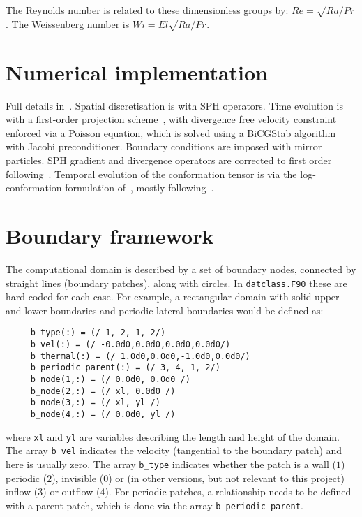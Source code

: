 \documentclass[notitlepage]{revtex4-2}
\begin{document}
The Reynolds number is related to these dimensionless groups by: $Re=\sqrt{Ra/Pr}$. The Weissenberg number is $Wi=El\sqrt{Ra/Pr}$.


\section{Numerical implementation}

Full details in~\cite{king_2021}. Spatial discretisation is with SPH operators. Time evolution is with a first-order projection scheme~\cite{chorin_1968}, with divergence free velocity constraint enforced via a Poisson equation, which is solved using a BiCGStab algorithm with Jacobi preconditioner. Boundary conditions are imposed with mirror particles. SPH gradient and divergence operators are corrected to first order following~\cite{bonet_lok}. Temporal evolution of the conformation tensor is via the log-conformation formulation of~\cite{fattal_2004,fattal_2005}, mostly following~\cite{lopez_2019}.

\section{Boundary framework}

The computational domain is described by a set of boundary nodes, connected by straight lines (boundary patches), along with circles. In \texttt{datclass.F90} these are hard-coded for each case. For example, a rectangular domain with solid upper and lower boundaries and periodic lateral boundaries would be defined as:
\begin{verbatim}
     b_type(:) = (/ 1, 2, 1, 2/)
     b_vel(:) = (/ -0.0d0,0.0d0,0.0d0,0.0d0/)    
     b_thermal(:) = (/ 1.0d0,0.0d0,-1.0d0,0.0d0/)
     b_periodic_parent(:) = (/ 3, 4, 1, 2/)
     b_node(1,:) = (/ 0.0d0, 0.0d0 /)
     b_node(2,:) = (/ xl, 0.0d0 /)
     b_node(3,:) = (/ xl, yl /)
     b_node(4,:) = (/ 0.0d0, yl /)
\end{verbatim}
where \texttt{xl} and \texttt{yl} are variables describing the length and height of the domain. The array \verb!b_vel! indicates the velocity (tangential to the boundary patch) and here is usually zero. The array \verb!b_type! indicates whether the patch is a wall ($1$) periodic ($2$), invisible ($0$) or (in other versions, but not relevant to this project) inflow ($3$) or outflow ($4$). For periodic patches, a relationship needs to be defined with a parent patch, which is done via the array \verb!b_periodic_parent!.
\end{document}
